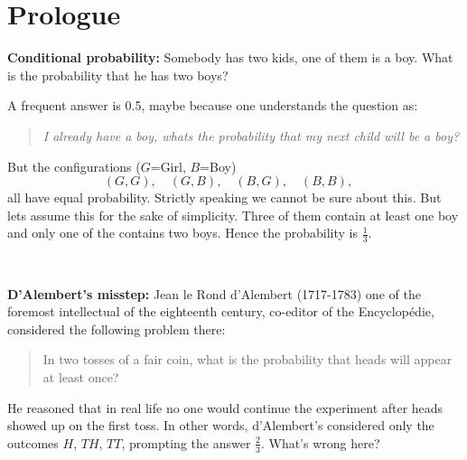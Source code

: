 \documentclass[twoside,11pt,a4paper]{article}
\newif\ifEN \ENtrue	                %
\def\tr|#1|#2|{\ifEN #2\else #1\fi}     %
\theoremstyle{definition}
\newcounter{exc}
\def\answerline#1{%
   \ifhmode\\[1ex]\fcolorbox{solbox}{solbox}{\hbox to \linewidth{\vbox to #1\baselineskip{}}}%
   \else\fcolorbox{solbox}{solbox}{\hbox to \linewidth{\vbox to #1\baselineskip{}}}%
   \fi
 }
\begin{document}
\section{\tr|Prolog|Prologue|}
\begin{exc}
  \textbf{\tr|Bedingte Wahrscheinlichkeit|Conditional probability|:}
    \tr|Jemand hat zwei Kinder, eines davon ist ein Junge. Wie gross ist die Wahrscheinlichkeit,
      dass er zwei Jungen hat?
      |Somebody has two kids, one of them is a boy. What is the probability that he has two boys?|
\end{exc}
\begin{Answer}
  \tr|Eine h"aufige Antwort ist 0.5, vielleicht, weil die Frage folgendermassen verstanden wird:
  |A frequent answer is  0.5, maybe because one  understands the question as:|
  \begin{quote}
    \emph{\tr|Wenn ich schon einen Jungen habe, was ist die Wahrscheinlichkeit, 
      dass das n"achste Kind auch ein Junge ist?
      |I already have a boy, whats the probability that my next child will be a boy?|} 
  \end{quote}
  \tr|Die Konfigurationen ($M$=M"adchen, $J$=Junge) 
  $$
  (M,M),\quad(M,J),\quad(J,M),\quad(J,J),\quad
  $$
  haben alle die gleiche Wahrscheinlichkeit.
  Ok, genau genommen wissen wir das nicht, aber gehen wir der Einfachheit halber davon aus.
  Drei davon enthalten mindestens einen Jungen,
  und von denen enth"alt wiederum nur eine zwei Jungen, also ist die gesuchte 
  Wahrscheinlichkeit $\frac13$.
  |But the configurations ($G$=Girl, $B$=Boy)
  $$
  (G,G),\quad(G,B),\quad(B,G),\quad(B,B),\quad
  $$
  all have equal probability.
  Strictly speaking we cannot be sure about this. But lets assume this for the sake of simplicity.
  Three of them contain at least one boy and only one of the 
  contains two boys. Hence the probability is $\frac13$. |
\end{Answer}
\answerline{5}
\begin{exc}
  \textbf{\tr|D'Alemberts Fehler|D'Alembert's misstep:|} 
  Jean le Rond d'Alembert (1717-1783) 
  \tr|einer der bekanntesten Intellektuellen seiner Zeit und Mitherausgeber der 
  \emph{Encyclop\'edie} betrachtete dort das folgende Problem:
  |one of the foremost intellectual of the eighteenth century,
  co-editor of the Encyclop\'edie, considered the following problem there:|
  \begin{quote}
    \tr|Wenn man eine faire M"unze zweimal wirft, was ist die Wahrscheinlichkeit, 
        mindestens einmal Kopf zu werfen?
       |In two tosses of a fair coin, what is the probability that heads will appear at least once?|
  \end{quote}
  \tr|Er argumentierte, dass im echtem Leben niemand weiterspielen w"urde wenn beim ersten Wurf Kopf erscheint. 
      Mit anderen Worten betrachtete d'Alambert nur die folgenden Resultate $K$, $ZK$, $ZZ$
      und kam auf die  Antwort $\frac23$. Wo liegt der Fehler?
     |He reasoned that in real life no one would continue the experiment after heads showed up on the first toss. 
      In other words, d'Alembert's considered only the outcomes  $H$, $TH$, $TT$, prompting the answer $\frac23$.
      What's wrong here?|
\end{exc}
\end{document}
